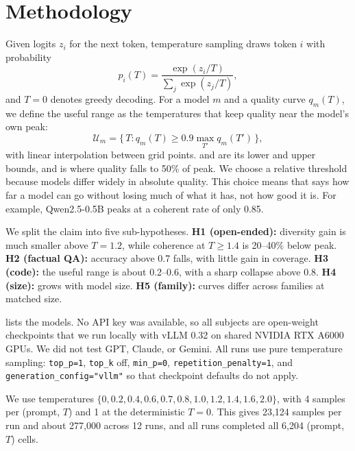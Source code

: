 \section{Methodology}
\label{sec:method}

Given logits $z_i$ for the next token, temperature sampling draws token $i$ with probability
\begin{equation}
p_i(T) = \frac{\exp(z_i / T)}{\sum_j \exp(z_j / T)},
\end{equation}
and $T = 0$ denotes greedy decoding. For a model $m$ and a quality curve $q_m(T)$, we define the useful range as the temperatures that keep quality near the model's own peak:
\begin{equation}
\mathcal{U}_m = \{\, T : q_m(T) \ge 0.9 \max_{T'} q_m(T') \,\},
\end{equation}
with linear interpolation between grid points. \Tlo and \Tu are its lower and upper bounds, and \Tfifty is where quality falls to 50\% of peak. We choose a relative threshold because models differ widely in absolute quality. This choice means that \Tu says how far a model can go without losing much of what it has, not how good it is. For example, Qwen2.5-0.5B peaks at a coherent rate of only 0.85.

We split the claim into five sub-hypotheses. {\bf H1 (open-ended):} diversity gain is much smaller above $T = 1.2$, while coherence at $T \ge 1.4$ is 20--40\% below peak. {\bf H2 (factual QA):} accuracy above 0.7 falls, with little gain in coverage. {\bf H3 (code):} the useful range is about 0.2--0.6, with a sharp collapse above 0.8. {\bf H4 (size):} \Tu grows with model size. {\bf H5 (family):} curves differ across families at matched size.

 lists the models. No API key was available, so all subjects are open-weight checkpoints that we run locally with vLLM 0.32 on shared NVIDIA RTX A6000 GPUs. We did not test GPT, Claude, or Gemini. All runs use pure temperature sampling: \texttt{top\_p=1}, \texttt{top\_k} off, \texttt{min\_p=0}, \texttt{repetition\_penalty=1}, and \texttt{generation\_config="vllm"} so that checkpoint defaults do not apply.



We use temperatures $\{0, 0.2, 0.4, 0.6, 0.7, 0.8, 1.0, 1.2, 1.4, 1.6, 2.0\}$, with 4 samples per (prompt, $T$) and 1 at the deterministic $T = 0$. This gives 23,124 samples per run and about 277,000 across 12 runs, and all runs completed all 6,204 (prompt, $T$) cells.

